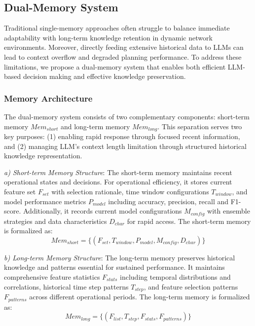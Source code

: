 \documentclass[conference]{IEEEtran}
\begin{document}
\subsection{Dual-Memory System}
Traditional single-memory approaches often struggle to balance immediate adaptability with long-term knowledge retention in dynamic network environments. Moreover, directly feeding extensive historical data to LLMs can lead to context overflow and degraded planning performance. To address these limitations, we propose a dual-memory system that enables both efficient LLM-based decision making and effective knowledge preservation.

\subsubsection{Memory Architecture}
The dual-memory system consists of two complementary components: short-term memory $Mem_{short}$ and long-term memory $Mem_{long}$. This separation serves two key purposes: (1) enabling rapid response through focused recent information, and (2) managing LLM's context length limitation through structured historical knowledge representation.

\textit{a) Short-term Memory Structure}: The short-term memory maintains recent operational states and decisions. For operational efficiency, it stores current feature set $F_{set}$ with selection rationale, time window configurations $T_{window}$, and model performance metrics $P_{model}$ including accuracy, precision, recall and F1-score. Additionally, it records current model configurations $M_{config}$ with ensemble strategies and data characteristics $D_{char}$ for rapid access. The short-term memory is formalized as:
\begin{equation}
    Mem_{short} = \{(F_{set}, T_{window}, P_{model}, M_{config}, D_{char})\}
\end{equation}

\textit{b) Long-term Memory Structure}: The long-term memory preserves historical knowledge and patterns essential for sustained performance. It maintains comprehensive feature statistics $F_{stats}$ including temporal distributions and correlations, historical time step patterns $T_{step}$, and feature selection patterns $F_{patterns}$ across different operational periods. The long-term memory is formalized as:
\begin{equation}
    Mem_{long} = \{(F_{list}, T_{step}, F_{stats}, F_{patterns})\}
\end{equation}
\end{document}
